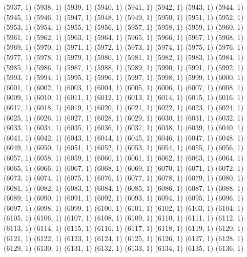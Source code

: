 {   (5937, 1)
   (5938, 1)
   (5939, 1)
   (5940, 1)
   (5941, 1)
   (5942, 1)
   (5943, 1)
   (5944, 1)
   (5945, 1)
   (5946, 1)
   (5947, 1)
   (5948, 1)
   (5949, 1)
   (5950, 1)
   (5951, 1)
   (5952, 1)
   (5953, 1)
   (5954, 1)
   (5955, 1)
   (5956, 1)
   (5957, 1)
   (5958, 1)
   (5959, 1)
   (5960, 1)
   (5961, 1)
   (5962, 1)
   (5963, 1)
   (5964, 1)
   (5965, 1)
   (5966, 1)
   (5967, 1)
   (5968, 1)
   (5969, 1)
   (5970, 1)
   (5971, 1)
   (5972, 1)
   (5973, 1)
   (5974, 1)
   (5975, 1)
   (5976, 1)
   (5977, 1)
   (5978, 1)
   (5979, 1)
   (5980, 1)
   (5981, 1)
   (5982, 1)
   (5983, 1)
   (5984, 1)
   (5985, 1)
   (5986, 1)
   (5987, 1)
   (5988, 1)
   (5989, 1)
   (5990, 1)
   (5991, 1)
   (5992, 1)
   (5993, 1)
   (5994, 1)
   (5995, 1)
   (5996, 1)
   (5997, 1)
   (5998, 1)
   (5999, 1)
   (6000, 1)
   (6001, 1)
   (6002, 1)
   (6003, 1)
   (6004, 1)
   (6005, 1)
   (6006, 1)
   (6007, 1)
   (6008, 1)
   (6009, 1)
   (6010, 1)
   (6011, 1)
   (6012, 1)
   (6013, 1)
   (6014, 1)
   (6015, 1)
   (6016, 1)
   (6017, 1)
   (6018, 1)
   (6019, 1)
   (6020, 1)
   (6021, 1)
   (6022, 1)
   (6023, 1)
   (6024, 1)
   (6025, 1)
   (6026, 1)
   (6027, 1)
   (6028, 1)
   (6029, 1)
   (6030, 1)
   (6031, 1)
   (6032, 1)
   (6033, 1)
   (6034, 1)
   (6035, 1)
   (6036, 1)
   (6037, 1)
   (6038, 1)
   (6039, 1)
   (6040, 1)
   (6041, 1)
   (6042, 1)
   (6043, 1)
   (6044, 1)
   (6045, 1)
   (6046, 1)
   (6047, 1)
   (6048, 1)
   (6049, 1)
   (6050, 1)
   (6051, 1)
   (6052, 1)
   (6053, 1)
   (6054, 1)
   (6055, 1)
   (6056, 1)
   (6057, 1)
   (6058, 1)
   (6059, 1)
   (6060, 1)
   (6061, 1)
   (6062, 1)
   (6063, 1)
   (6064, 1)
   (6065, 1)
   (6066, 1)
   (6067, 1)
   (6068, 1)
   (6069, 1)
   (6070, 1)
   (6071, 1)
   (6072, 1)
   (6073, 1)
   (6074, 1)
   (6075, 1)
   (6076, 1)
   (6077, 1)
   (6078, 1)
   (6079, 1)
   (6080, 1)
   (6081, 1)
   (6082, 1)
   (6083, 1)
   (6084, 1)
   (6085, 1)
   (6086, 1)
   (6087, 1)
   (6088, 1)
   (6089, 1)
   (6090, 1)
   (6091, 1)
   (6092, 1)
   (6093, 1)
   (6094, 1)
   (6095, 1)
   (6096, 1)
   (6097, 1)
   (6098, 1)
   (6099, 1)
   (6100, 1)
   (6101, 1)
   (6102, 1)
   (6103, 1)
   (6104, 1)
   (6105, 1)
   (6106, 1)
   (6107, 1)
   (6108, 1)
   (6109, 1)
   (6110, 1)
   (6111, 1)
   (6112, 1)
   (6113, 1)
   (6114, 1)
   (6115, 1)
   (6116, 1)
   (6117, 1)
   (6118, 1)
   (6119, 1)
   (6120, 1)
   (6121, 1)
   (6122, 1)
   (6123, 1)
   (6124, 1)
   (6125, 1)
   (6126, 1)
   (6127, 1)
   (6128, 1)
   (6129, 1)
   (6130, 1)
   (6131, 1)
   (6132, 1)
   (6133, 1)
   (6134, 1)
   (6135, 1)
   (6136, 1)
}
